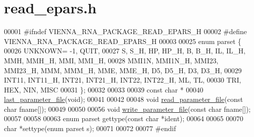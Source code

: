 \hypertarget{read__epars_8h_source}{}\section{read\+\_\+epars.\+h}
\label{read__epars_8h_source}

\begin{DoxyCode}
00001 \textcolor{preprocessor}{#ifndef VIENNA\_RNA\_PACKAGE\_READ\_EPARS\_H}
00002 \textcolor{preprocessor}{#define VIENNA\_RNA\_PACKAGE\_READ\_EPARS\_H}
00003 
00025 \textcolor{keyword}{enum} parset \{
00026   UNKNOWN= -1, QUIT,
00027   S, S\_H, HP, HP\_H, B, B\_H, IL, IL\_H, MMH, MMH\_H, MMI, MMI\_H,
00028   MMI1N, MMI1N\_H, MMI23, MMI23\_H, MMM, MMM\_H, MME, MME\_H, D5, D5\_H, D3, D3\_H,
00029   INT11, INT11\_H, INT21, INT21\_H, INT22, INT22\_H, ML, TL,
00030   TRI, HEX, NIN, MISC
00031 \};
00032 
00033 
00039 \textcolor{keyword}{const} \textcolor{keywordtype}{char} *
00040 \hyperlink{group__energy__parameters__rw_ga5abafd7bad6d506e18bed13b18123cfe}{last\_parameter\_file}(\textcolor{keywordtype}{void});
00041 
00042 
00048 \textcolor{keywordtype}{void}  \hyperlink{group__energy__parameters__rw_ga165a142a3c68fb6655c69ef4ab7cd749}{read\_parameter\_file}(\textcolor{keyword}{const} \textcolor{keywordtype}{char} fname[]);
00049 
00050 
00056 \textcolor{keywordtype}{void}  \hyperlink{group__energy__parameters__rw_ga8a43459be386a7489feeab68dc2c6c76}{write\_parameter\_file}(\textcolor{keyword}{const} \textcolor{keywordtype}{char} fname[]);
00057 
00058 
00063 \textcolor{keyword}{enum}  parset gettype(\textcolor{keyword}{const} \textcolor{keywordtype}{char} *ident);
00064 
00065 
00070 \textcolor{keywordtype}{char} *settype(\textcolor{keyword}{enum} parset s);
00071 
00072 
00077 \textcolor{preprocessor}{#endif}
\end{DoxyCode}
